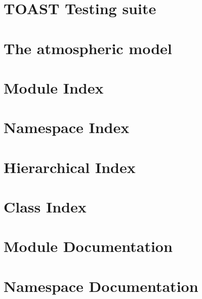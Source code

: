 \let\mypdfximage\pdfximage\def\pdfximage{\immediate\mypdfximage}\documentclass[twoside]{book}
\newcommand{\+}{\discretionary{\mbox{\scriptsize$\hookleftarrow$}}{}{}}
\begin{document}
\chapter{T\+O\+A\+ST Testing suite}
\label{md__home_algebrato__progetti__c_m_b4_g_libcal_src_pycal_tests__r_e_a_d_m_e}

\chapter{The atmospheric model}
\label{church_model}

\chapter{Module Index}

\chapter{Namespace Index}

\chapter{Hierarchical Index}

\chapter{Class Index}

\chapter{Module Documentation}



\chapter{Namespace Documentation}




\end{document}
